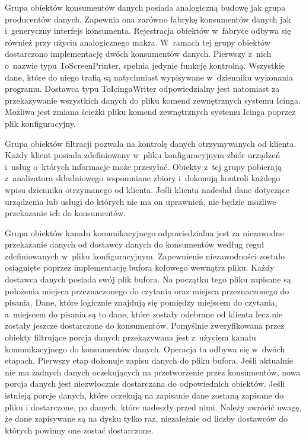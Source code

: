 Grupa obiektów konsumentów danych posiada analogiczną budowę jak grupa
producentów danych. Zapewnia ona zarówno fabrykę konsumentów danych
jak i~generyczny interfejs konsumenta. Rejestracja obiektów w~fabryce
odbywa się również przy użyciu analogicznego makra. W~ramach tej grupy
obiektów dostarczono implementację dwóch konsumentów danych. Pierwszy
z~nich o~nazwie typu ToScreenPrinter, spełnia jedynie funkcję
kontrolną. Wszystkie dane, które do niego trafią są natychmiast
wypisywane w~dzienniku wykonania programu. Dostawca typu
ToIcingaWriter odpowiedzialny jest natomiast za przekazywanie
wszystkich danych do pliku komend zewnętrznych systemu Icinga. Możliwa
jest zmiana ścieżki pliku komend zewnętrznych systemu Icinga poprzez
plik konfiguracyjny.

Grupa obiektów filtracji pozwala na kontrolę danych otrzymywanych od
klienta. Każdy klient posiada zdefiniowany w~pliku konfiguracyjnym
zbiór urządzeń i~usług o~których informacje może przesyłać. Obiekty
z~tej grupy pobierają z~analizatora składniowego wspomniane zbiory
i~dokonują kontroli każdego wpisu dziennika otrzymanego od
klienta. Jeśli klienta nadesłał dane dotyczące urządzenia lub usługi
do których nie ma on uprawnień, nie będzie możliwe przekazanie ich do
konsumentów.

Grupa obiektów kanału komunikacyjnego odpowiedzialna jest za
niezawodne przekazanie danych od dostawcy danych do konsumentów według
reguł zdefiniowanych w~pliku konfiguracyjnym. Zapewnienie
niezawodności zostało osiągnięte poprzez implementację bufora kołowego
wewnątrz pliku. Każdy dostawca danych posiada swój plik bufora. Na
początku tego pliku zapisane są położenia miejsca przeznaczonego do
czytania oraz miejsca przeznaczonego do pisania. Dane, które logicznie
znajdują się pomiędzy miejscem do czytania, a~miejscem do pisania są
to dane, które zostały odebrane od klienta lecz nie zostały jeszcze
dostarczone do konsumentów. Pomyślnie zweryfikowana przez obiekty
filtrujące porcja danych przekazywana jest z~użyciem kanału
komunikacyjnego do konsumentów danych. Operacja ta odbywa się w~dwóch
etapach. Pierwszy etap dokonuje zapisu danych do pliku bufora. Jeśli
aktualnie nie ma żadnych danych oczekujących na przetworzenie przez
konsumentów, nowa porcja danych jest niezwłocznie dostarczana do
odpowiednich obiektów. Jeśli istnieją porcje danych, które oczekują na
zapisanie dane zostaną zapisane do pliku i dostarczone, po danych,
które nadeszły przed nimi. Należy zwrócić uwagę, że dane zapisywane są
na dysku tylko raz, niezależnie od liczby dostawców do których powinny
one zostać dostarczone.

